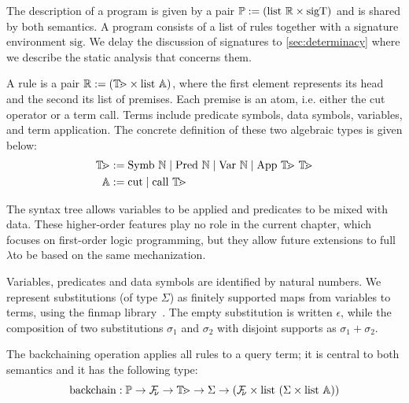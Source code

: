 

The description of a program is given by a pair
$\mathbb{P} := (\mathrm{list}\ \mathbb{R} \times \mathrm{sigT})$ and is shared by
both semantics. A program consists of a list of rules together with a signature
environment $\mathrm{sig}$.
We delay the discussion of signatures to \cref{sec:determinacy} where we
describe the static analysis that concerns them.

A rule is a pair $\mathbb{R} := (\mathbb{T\!m} \times \mathrm{list}\ \mathbb{A})$, where
the first element represents its head and the second its list of premises. Each
premise is an atom, i.e. either the cut operator or a term
call. Terms include predicate symbols, data symbols, variables, and term application.
The concrete definition of these two algebraic types is given below:
%
\begin{align*}
  \TERM & := \mathrm{Symb}\ \mathbb{N} \mid \mathrm{Pred}\ \mathbb{N} \mid \mathrm{Var}\ \mathbb{N} \mid \mathrm{App}\ \TERM\ \TERM\\
  \ATOM & := \mathrm{cut} \mid \mathrm{call}\ \TERM
\end{align*}

The syntax tree allows variables to be applied and predicates to be mixed with
data. These higher-order features play no role in the current chapter, which
focuses on first-order logic programming, but they allow future extensions to
full $\lambda$\prolog to be based on the same mechanization.


Variables, predicates and data symbols
are identified by natural numbers. We represent substitutions
(of type $\Sigma$) as finitely supported maps from variables to terms, using the
finmap library~\cite{finmap}.
The empty substitution is written $\epsilon$,
while the composition of two substitutions $\sigma_1$ and $\sigma_2$ with
disjoint supports as $\sigma_1 + \sigma_2$.
 
The backchaining operation applies all rules to a query term; it is
central to both semantics and it has the following type:
%
%
$$\mathrm{backchain} : \mathbb{P} \to \FV \to \TERM \to \Sigma \to (\FV \times \mathrm{list}\ (\Sigma \times \mathrm{list}\ \ATOM)) $$

